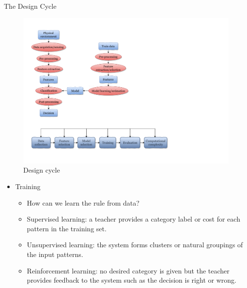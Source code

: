 \begin{frame}{The Design Cycle}
\begin{figure}
\includegraphics[width=\textwidth]{Figures/DesignCycle}
\caption{Design cycle}
\end{figure}
\begin{itemize}
\item {\color{mycolor2}Training}
\begin{itemize}
\setlength{\itemsep}{3pt}
\item How can we learn the rule from data?
\item Supervised learning: a teacher provides a category label or
cost for each pattern in the training set.
\item Unsupervised learning: the system forms clusters or natural groupings of the input patterns.
\item Reinforcement learning: no desired category is given but the teacher provides feedback to the system such as the
decision is right or wrong.
\end{itemize}
\end{itemize}
\end{frame}

